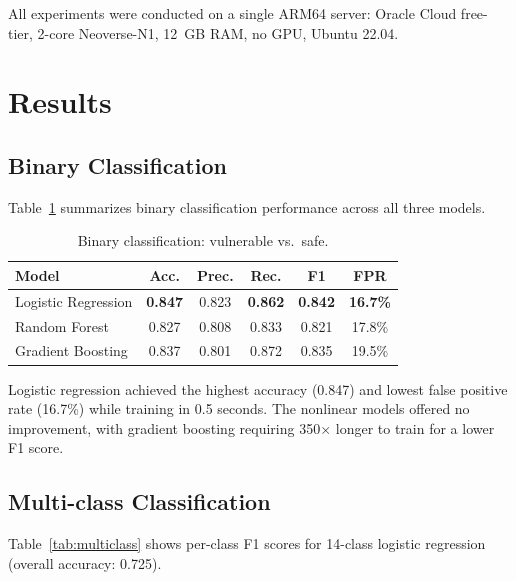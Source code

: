 \documentclass[11pt,a4paper]{article}
\begin{document}
All experiments were conducted on a single ARM64 server: Oracle Cloud free-tier, 2-core Neoverse-N1, 12~GB RAM, no GPU, Ubuntu 22.04.

\section{Results}

\subsection{Binary Classification}

Table~\ref{tab:binary} summarizes binary classification performance across all three models.

\begin{table}[H]
\centering
\caption{Binary classification: vulnerable vs.\ safe.}
\label{tab:binary}
\begin{tabular}{lccccc}
\toprule
\textbf{Model} & \textbf{Acc.} & \textbf{Prec.} & \textbf{Rec.} & \textbf{F1} & \textbf{FPR} \\
\midrule
Logistic Regression & \textbf{0.847} & 0.823 & \textbf{0.862} & \textbf{0.842} & \textbf{16.7\%} \\
Random Forest & 0.827 & 0.808 & 0.833 & 0.821 & 17.8\% \\
Gradient Boosting & 0.837 & 0.801 & 0.872 & 0.835 & 19.5\% \\
\bottomrule
\end{tabular}
\end{table}

Logistic regression achieved the highest accuracy (0.847) and lowest false positive rate (16.7\%) while training in 0.5 seconds. The nonlinear models offered no improvement, with gradient boosting requiring 350$\times$ longer to train for a lower F1 score.

\subsection{Multi-class Classification}

Table~\ref{tab:multiclass} shows per-class F1 scores for 14-class logistic regression (overall accuracy: 0.725).
\end{document}
